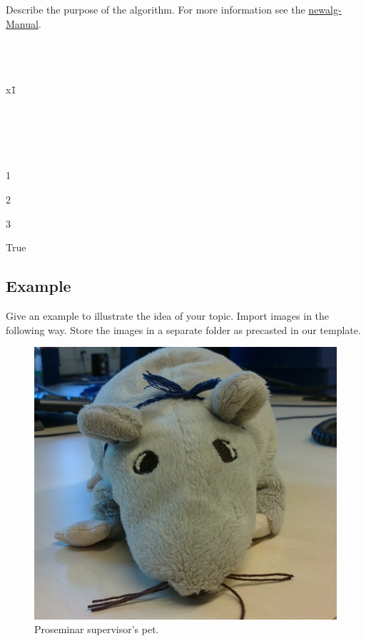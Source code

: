 \begin{Algorithm}
	\caption{Describe the purpose of the algorithm. For more 
	information see the \href{../manuals/newalg.pdf}{newalg-
	Manual}.}
	\label{alg:nameOfAlgorithm}
	\begin{algorithm}{}{}
		 \\
		 \\
		 \\
		x\=1 \\
		\begin{WHILE}{}
			 \\
			 \\
		\end{WHILE} \\
		\begin{IF}{}
			1 \\
		\ELSE
			\begin{IF}{}
				2 \\
			\end{IF}
		\ELSE
			3 \\
		\end{IF}
		\RETURN True
	\end{algorithm}
\end{Algorithm}

\subsection{Example}
Give an example to illustrate the idea of your topic. Import images
in the following way. Store the images in a separate folder as 
precasted in our template.

\begin{figure}[htb]
	\begin{center}
		\includegraphics[width=0.8\linewidth]{pictures/ratte.jpg}
	\end{center}
	\caption{Proseminar supervisor's pet.}
	\label{fig:rat}
\end{figure}
